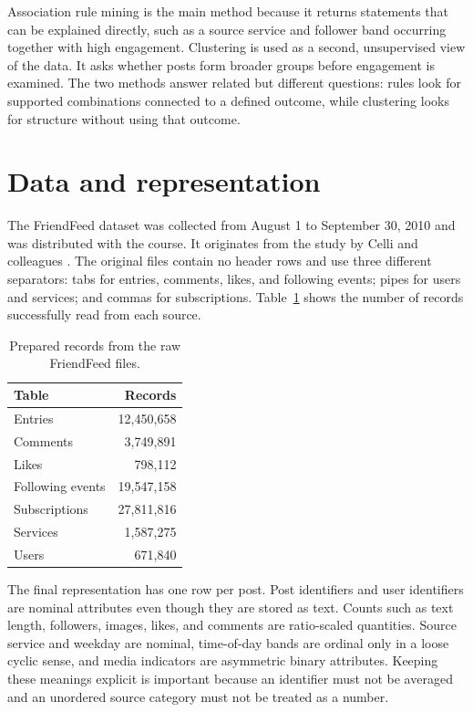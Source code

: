 \documentclass[10pt,a4paper]{article}
\begin{document}
Association rule mining is the main method because it returns statements that can be explained directly, such as a source service and follower band occurring together with high engagement. Clustering is used as a second, unsupervised view of the data. It asks whether posts form broader groups before engagement is examined. The two methods answer related but different questions: rules look for supported combinations connected to a defined outcome, while clustering looks for structure without using that outcome.

\section{Data and representation}

The FriendFeed dataset was collected from August 1 to September 30, 2010 and was distributed with the course. It originates from the study by Celli and colleagues \cite{celli2010}. The original files contain no header rows and use three different separators: tabs for entries, comments, likes, and following events; pipes for users and services; and commas for subscriptions. Table~\ref{tab:raw-data} shows the number of records successfully read from each source.

\begin{table}[ht]
\centering
\caption{Prepared records from the raw FriendFeed files.}
\label{tab:raw-data}
\begin{tabular}{lr}
\toprule
Table & Records \\
\midrule
Entries & 12,450,658 \\
Comments & 3,749,891 \\
Likes & 798,112 \\
Following events & 19,547,158 \\
Subscriptions & 27,811,816 \\
Services & 1,587,275 \\
Users & 671,840 \\
\bottomrule
\end{tabular}
\end{table}

The final representation has one row per post. Post identifiers and user identifiers are nominal attributes even though they are stored as text. Counts such as text length, followers, images, likes, and comments are ratio-scaled quantities. Source service and weekday are nominal, time-of-day bands are ordinal only in a loose cyclic sense, and media indicators are asymmetric binary attributes. Keeping these meanings explicit is important because an identifier must not be averaged and an unordered source category must not be treated as a number.
\end{document}

